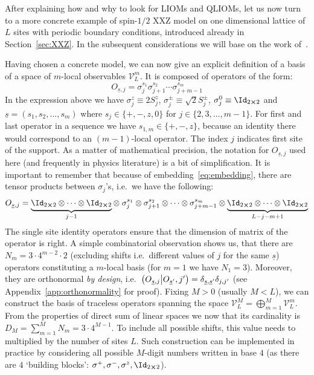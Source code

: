 After explaining how and why to look for LIOMs and QLIOMs, let us now turn to a more concrete
example of spin-\(1/2\) XXZ model on one dimensional lattice of \(L\) sites with periodic
boundary conditions, introduced already in Section~\ref{sec:XXZ}. In the subsequent
considerations we will base on the work of~\textcite{Mierzejewski2015a}.

Having chosen a concrete model, we can now give an explicit definition of a basis
of a space of \(m\)-local observables \(\mathcal{V}_L^m\). It is composed of operators
of the form:
\begin{equation}
  O_{\underline{s},j}=\sigma_{j}^{s_{1}} \sigma_{j+1}^{s_{2}} \cdots 
  \sigma_{j+m-1}^{s_{m}}
  \label{eq:basis operator}
\end{equation}
In the expression above we have \(\sigma_j^z \equiv 2 S^z_j\),
\(\sigma_j^{\pm} \equiv \sqrt{2} S_j^{\pm}\), \(\sigma^{0}_j \equiv \Id_{2\cross 2}\) and
 \(\underline{s} = \left(s_1, s_2,\ldots, s_m\right)\) where \(s_j \in \{+,-,z,0\}\) for
 \(j \in \{2,3,\ldots,m-1\}\). For first and last operator in a sequence we have 
 \(s_{1,m} \in \{+,-,z\}\), because an identity there would correspond to an \((m-1)\)-local
 operator. The index \(j\) indicates first site of the support.
As a matter of mathematical precision, the notation for \(O_{\underline{s},j}\) used here 
(and frequently in physics literature) is a bit of simplification. It is important to remember
that because of embedding~\eqref{eq:embedding}, there are tensor products between \(\sigma_j\)'s, i.e.\ we have the following:
\begin{equation}
  O_{\underline{s},j}= \underbrace{\Id_{2\cross 2} \otimes \cdots
       \otimes \Id_{2\cross 2}}_{j-1} \otimes \; \sigma_{j}^{s_{1}} \otimes \sigma_{j+1}^{s_{2}} \otimes
        \cdots \otimes \sigma_{j+m-1}^{s_{m}} \otimes 
        \underbrace{\Id_{2\cross 2} \otimes \cdots \otimes \Id_{2\cross 2}}_{L-j-m+1}
        \label{eq:basis with tensors}
\end{equation}
The single site identity operators ensure that the dimension of matrix of the operator is right.
A simple combinatorial observation shows us, that there are \(N_m = 3\cdot 4^{m-2}\cdot 2\)
(excluding shifts i.e.\ different values of \(j\) for the same \(\underline{s}\)) operators
constituting a \(m\)-local basis (for \(m = 1\) we have \(N_1 = 3\)). Moreover, they are orthonormal
\textit{by design}, i.e.\ \(\left(O_{\underline{s},j} \middle| O_{\underline{s}^{\prime}},j^{\prime}\right) =
\delta_{\underline{s},\underline{s}^{\prime}}\delta_{j,j^{\prime}}\) (see Appendix~\ref{app:orthonormality} for proof).
Fixing \(M>0\) (usually \(M<L\)), we can construct the basis of traceless operators spanning
the space \(\mathcal{V}_L^M = \bigoplus_{m=1}^{M} \mathcal{V}_L^m\). From the properties of 
direct sum of linear spaces we now that its cardinality is \(D_M = \sum_{m=1}^{M} N_m = 
 3 \cdot 4^{M-1}\). To include all possible shifts, this value needs to multiplied by
 the number of sites \(L\). Such construction can be implemented in practice by considering
 all possible \(M\)-digit numbers written in base \(4\) (as there are \(4\) `building blocks':
  \(\sigma^{+},\sigma^{-},\sigma^{z},\Id_{2\cross 2}\)). 

